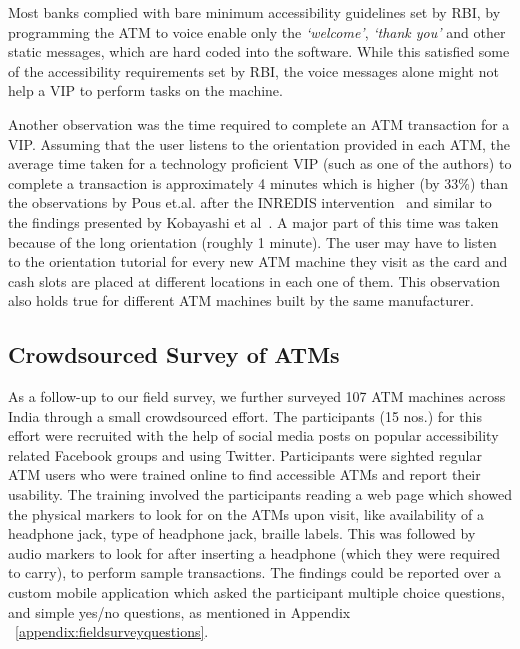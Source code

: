 Most banks complied with bare minimum accessibility guidelines set by RBI, by programming the ATM to voice enable only the \textit{`welcome'}, \textit{`thank you'} and other static messages, which are hard coded into the software. While this satisfied some of the accessibility requirements set by RBI, the voice messages alone might not help a VIP to perform tasks on the machine.

Another observation was the time required to complete an ATM transaction for a VIP. Assuming that the user listens to the orientation provided in each ATM, the average time taken for a technology proficient VIP (such as one of the  authors) to complete a transaction is approximately 4 minutes which is higher (by 33\%) than the observations by Pous et.al. after the INREDIS intervention~\cite{pous2012enhancing} and similar to the findings presented by Kobayashi et al~\cite{kobayashi2000inclusive}. A major part of this time was taken because of the long orientation (roughly 1 minute). The user may have to listen to the orientation tutorial for every new ATM machine they visit as the card and cash slots are placed at different locations in each one of them. This observation also holds true for different ATM machines built by the same manufacturer.

\subsection{Crowdsourced Survey of ATMs}
\label{ssec:crowdsourcedsurvey}

As a follow-up to our field survey, we further surveyed 107 ATM machines across India through a small crowdsourced effort. The participants (15 nos.) for this effort were recruited with the help of social media posts on popular accessibility related Facebook groups and using Twitter. Participants were sighted regular ATM users who were trained online to find accessible ATMs and report their usability. The training involved the participants reading a web page which showed the physical markers to look for on the ATMs upon visit, like availability of a headphone jack, type of headphone jack, braille labels. This was followed by audio markers to look for after inserting a headphone (which they were required to carry), to perform sample transactions. The findings could be reported over a custom mobile application which asked the participant multiple choice questions, and simple yes/no questions, as mentioned in Appendix ~\ref{appendix:fieldsurveyquestions}.

